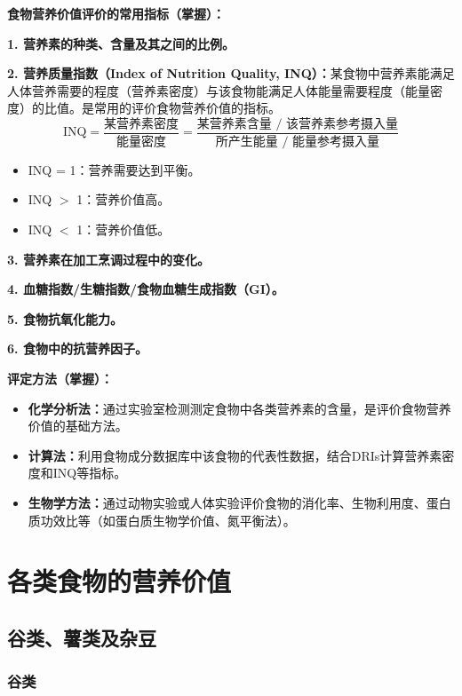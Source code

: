 \begin{keybox}
\textbf{食物营养价值评价的常用指标（掌握）：}

\textbf{1. 营养素的种类、含量及其之间的比例。}

\textbf{2. 营养质量指数（Index of Nutrition Quality, INQ）：}某食物中营养素能满足人体营养需要的程度（营养素密度）与该食物能满足人体能量需要程度（能量密度）的比值。是常用的评价食物营养价值的指标。
\[
\text{INQ} = \frac{\text{某营养素密度}}{\text{能量密度}} = \frac{\text{某营养素含量 / 该营养素参考摄入量}}{\text{所产生能量 / 能量参考摄入量}}
\]
\begin{itemize}[leftmargin=*]
    \item INQ = 1：营养需要达到平衡。
    \item INQ $>$ 1：营养价值高。
    \item INQ $<$ 1：营养价值低。
\end{itemize}

\textbf{3. 营养素在加工烹调过程中的变化。}

\textbf{4. 血糖指数/生糖指数/食物血糖生成指数（GI）。}

\textbf{5. 食物抗氧化能力。}

\textbf{6. 食物中的抗营养因子。}

\vspace{4pt}
\textbf{评定方法（掌握）：}
\begin{itemize}[leftmargin=*]
    \item \textbf{化学分析法：}通过实验室检测测定食物中各类营养素的含量，是评价食物营养价值的基础方法。
    \item \textbf{计算法：}利用食物成分数据库中该食物的代表性数据，结合DRIs计算营养素密度和INQ等指标。
    \item \textbf{生物学方法：}通过动物实验或人体实验评价食物的消化率、生物利用度、蛋白质功效比等（如蛋白质生物学价值、氮平衡法）。
\end{itemize}
\end{keybox}

\section{各类食物的营养价值}

\subsection{谷类、薯类及杂豆}

\subsubsection{谷类}

